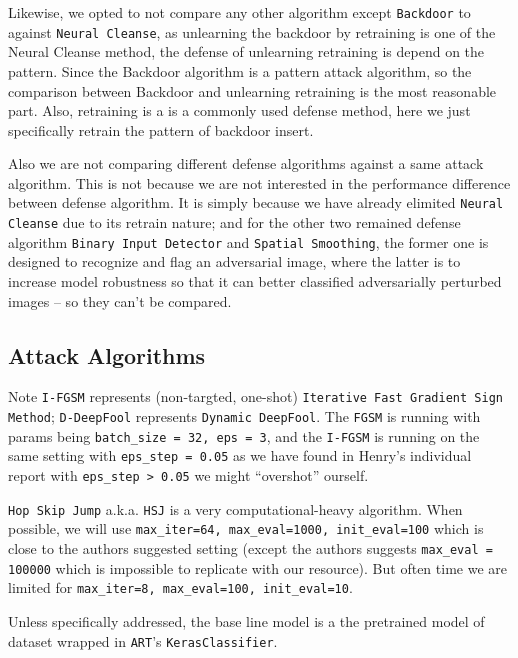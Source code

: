 \documentclass[11pt]{article}
\newcommand{\ilc}{\texttt}
\begin{document}
Likewise, we opted to not compare any other algorithm except \ilc{Backdoor} to against \ilc{Neural Cleanse}, as unlearning the backdoor by retraining is one of the Neural Cleanse method, the defense of unlearning retraining is depend on the pattern. Since the Backdoor algorithm is a pattern attack algorithm, so the comparison between Backdoor and unlearning retraining is the most reasonable part. Also, retraining is a is a commonly used defense method, here we just specifically retrain the pattern of backdoor insert.

Also we are not comparing different defense algorithms against a same attack algorithm. This is not because we are not interested in the performance difference between defense algorithm. It is simply because we have already elimited \ilc{Neural Cleanse} due to its retrain nature; and for the other two remained defense algorithm \ilc{Binary Input Detector} and \ilc{Spatial Smoothing}, the former one is designed to recognize and flag an adversarial image, where the latter is to increase model robustness so that it can better classified adversarially perturbed images -- so they can't be compared.


\subsection{Attack Algorithms}\label{attack_algo}

Note \ilc{I-FGSM} represents (non-targted, one-shot) \ilc{Iterative Fast Gradient Sign Method};  \ilc{D-DeepFool} represents \ilc{Dynamic DeepFool}. The \ilc{FGSM} is running with params being \ilc{batch\_size = 32, eps = 3}, and the \ilc{I-FGSM} is running on the same setting with \ilc{eps\_step = 0.05} as we have found in Henry's individual report with \ilc{eps\_step > 0.05} we might ``overshot'' ourself. \newline

\ilc{Hop Skip Jump} a.k.a. \ilc{HSJ} is a very computational-heavy algorithm. When possible, we will use \ilc{max\_iter=64, max\_eval=1000, init\_eval=100} which is close to the authors suggested setting (except the authors suggests \ilc{max\_eval = 100000} which is impossible to replicate with our resource). But often time we are limited for \ilc{max\_iter=8, max\_eval=100, init\_eval=10}. \newline

Unless specifically addressed, the base line model is a the pretrained model of dataset wrapped in \ilc{ART}'s \ilc{KerasClassifier}.
\end{document}
